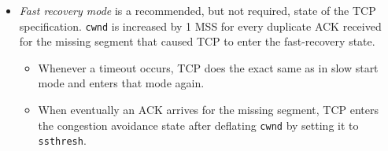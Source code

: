 \documentclass[table, xcdraw]{article}%
\begin{document}
\begin{itemize}
\begin{itemize}
\begin{itemize}
        \end{itemize}
        \item \emph{Fast recovery mode} is a recommended, but not required, state of the TCP specification. \texttt{cwnd} is increased by 1 MSS for every duplicate ACK received for the missing segment that caused TCP to enter the fast-recovery state.
        \begin{itemize}
            \item Whenever a timeout occurs, TCP does the exact same as in slow start mode and enters that mode again.
            \item When eventually an ACK arrives for the missing segment, TCP enters the congestion avoidance state after deflating \texttt{cwnd} by setting it to \texttt{ssthresh}.
        \end{itemize}
    \end{itemize}


\end{itemize}
\end{document}
